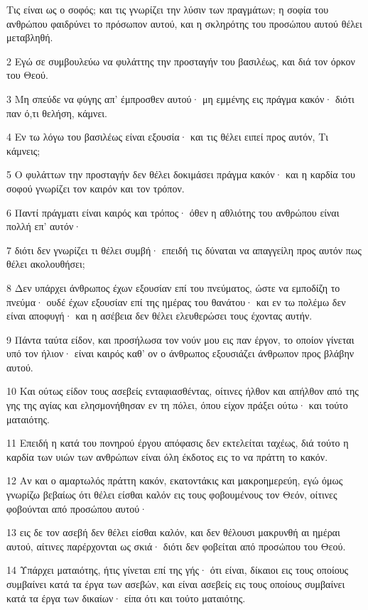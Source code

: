 \par Τις είναι ως ο σοφός; και τις γνωρίζει την λύσιν των πραγμάτων; η σοφία του ανθρώπου φαιδρύνει το πρόσωπον αυτού, και η σκληρότης του προσώπου αυτού θέλει μεταβληθή.
\par 2 Εγώ σε συμβουλεύω να φυλάττης την προσταγήν του βασιλέως, και διά τον όρκον του Θεού.
\par 3 Μη σπεύδε να φύγης απ' έμπροσθεν αυτού· μη εμμένης εις πράγμα κακόν· διότι παν ό,τι θελήση, κάμνει.
\par 4 Εν τω λόγω του βασιλέως είναι εξουσία· και τις θέλει ειπεί προς αυτόν, Τι κάμνεις;
\par 5 Ο φυλάττων την προσταγήν δεν θέλει δοκιμάσει πράγμα κακόν· και η καρδία του σοφού γνωρίζει τον καιρόν και τον τρόπον.
\par 6 Παντί πράγματι είναι καιρός και τρόπος· όθεν η αθλιότης του ανθρώπου είναι πολλή επ' αυτόν·
\par 7 διότι δεν γνωρίζει τι θέλει συμβή· επειδή τις δύναται να απαγγείλη προς αυτόν πως θέλει ακολουθήσει;
\par 8 Δεν υπάρχει άνθρωπος έχων εξουσίαν επί του πνεύματος, ώστε να εμποδίζη το πνεύμα· ουδέ έχων εξουσίαν επί της ημέρας του θανάτου· και εν τω πολέμω δεν είναι αποφυγή· και η ασέβεια δεν θέλει ελευθερώσει τους έχοντας αυτήν.
\par 9 Πάντα ταύτα είδον, και προσήλωσα τον νούν μου εις παν έργον, το οποίον γίνεται υπό τον ήλιον· είναι καιρός καθ' ον ο άνθρωπος εξουσιάζει άνθρωπον προς βλάβην αυτού.
\par 10 Και ούτως είδον τους ασεβείς ενταφιασθέντας, οίτινες ήλθον και απήλθον από της γης της αγίας και ελησμονήθησαν εν τη πόλει, όπου είχον πράξει ούτω· και τούτο ματαιότης.
\par 11 Επειδή η κατά του πονηρού έργου απόφασις δεν εκτελείται ταχέως, διά τούτο η καρδία των υιών των ανθρώπων είναι όλη έκδοτος εις το να πράττη το κακόν.
\par 12 Αν και ο αμαρτωλός πράττη κακόν, εκατοντάκις και μακροημερεύη, εγώ όμως γνωρίζω βεβαίως ότι θέλει είσθαι καλόν εις τους φοβουμένους τον Θεόν, οίτινες φοβούνται από προσώπου αυτού·
\par 13 εις δε τον ασεβή δεν θέλει είσθαι καλόν, και δεν θέλουσι μακρυνθή αι ημέραι αυτού, αίτινες παρέρχονται ως σκιά· διότι δεν φοβείται από προσώπου του Θεού.
\par 14 Υπάρχει ματαιότης, ήτις γίνεται επί της γής· ότι είναι, δίκαιοι εις τους οποίους συμβαίνει κατά τα έργα των ασεβών, και είναι ασεβείς εις τους οποίους συμβαίνει κατά τα έργα των δικαίων· είπα ότι και τούτο ματαιότης.
